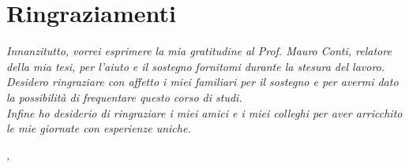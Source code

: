 
\cleardoublepage
{}
{}


\bigskip

\begingroup
\let\clearpage\relax
\let\cleardoublepage\relax
\let\cleardoublepage\relax

\chapter*{Ringraziamenti}

\noindent \textit{Innanzitutto, vorrei esprimere la mia gratitudine al Prof. Mauro Conti, relatore della mia tesi, per l'aiuto e il sostegno fornitomi durante la stesura del lavoro.}\\

\noindent \textit{Desidero ringraziare con affetto i miei familiari per il sostegno e per avermi dato la possibilità di frequentare questo corso di studi.}\\

\noindent \textit{Infine ho desiderio di ringraziare i miei amici e i miei colleghi per aver arricchito le mie giornate con esperienze uniche.}\\
\bigskip

\noindent\textit{\myLocation, \myTime}
\hfill \myName

\endgroup

